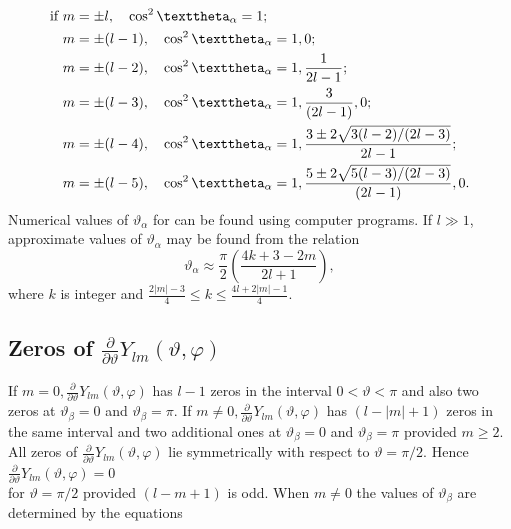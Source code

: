 \begin{align}
\text{if }m & = \pm l, \quad \cos ^{2} \vartheta_{\alpha}=1 ;  \notag\\
m & = \pm(l-1), \quad \cos ^{2} \vartheta_{\alpha}=1,0 ;  \notag\\
m & = \pm(l-2), \quad \cos ^{2} \vartheta_{\alpha}=1, \frac{1}{2 l-1} ;  \notag\\
m & = \pm(l-3), \quad \cos ^{2} \vartheta_{\alpha}=1, \frac{3}{(2 l-1)}, 0 ;  \notag\\
m & = \pm(l-4), \quad \cos ^{2} \vartheta_{\alpha}=1, \frac{3 \pm 2 \sqrt{3(l-2) /(2 l-3)}}{2 l-1} ;  \notag\\
m & = \pm(l-5), \quad \cos ^{2} \vartheta_{\alpha}=1, \frac{5 \pm 2 \sqrt{5(l-3) /(2 l-3)}}{(2 l-1)}, 0 . \label{eq:5:15:2}
\end{align}
Numerical values of $\vartheta_{\alpha}$ for can be found using computer programs. 
If $l \gg 1$, approximate values of $\vartheta_{\alpha}$ may be found from the relation
\begin{equation}
\vartheta_{\alpha} \approx \frac{\pi}{2}\left(\frac{4 k+3-2 m}{2 l+1}\right), \label{eq:5:15:3}
\end{equation}
where $k$ is integer and $\frac{2|m|-3}{4} \leq k \leq \frac{4 l+2|m|-1}{4}$.


\subsection{Zeros of $\frac{\partial}{\partial \vartheta} Y_{l m}(\vartheta, \varphi)$}\label{sec:5.15.2}
If $m=0, \frac{\partial}{\partial \vartheta} Y_{l m}(\vartheta, \varphi)$ has $l-1$ zeros in the interval $0<\vartheta<\pi$ and also two zeros at $\vartheta_{\beta}=0$ and $\vartheta_{\beta}=\pi$. If $m \neq 0, \frac{\partial}{\partial \vartheta} Y_{l m}(\vartheta, \varphi)$ has $(l-|m|+1)$ zeros in the same interval and two additional ones at $\vartheta_{\beta}=0$ and $\vartheta_{\beta}=\pi$ provided $m \geq 2$. All zeros of $\frac{\partial}{\partial \vartheta} Y_{l m}(\vartheta, \varphi)$ lie symmetrically with respect to $\vartheta=\pi / 2$. Hence $\frac{\partial}{\partial \vartheta} Y_{l m}(\vartheta, \varphi)=0$\\
for $\vartheta=\pi / 2$ provided $(l-m+1)$ is odd. When $m \neq 0$ the values of $\vartheta_{\beta}$ are determined by the equations

